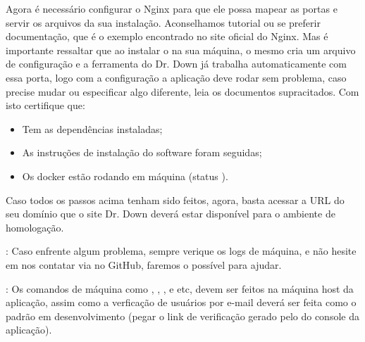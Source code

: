 \documentclass[letterpaper,10pt,english]{sphinxmanual}
\begin{document}
Agora é necessário configurar o Nginx para que ele possa mapear as portas e servir os arquivos da sua instalação.
Aconselhamos  tutorial ou se preferir  documentação, que é o exemplo encontrado no site oficial do Nginx.
Mas é importante ressaltar que ao instalar o  na sua máquina, o mesmo cria um arquivo  de configuração e a ferramenta do Dr. Down já trabalha automaticamente com essa porta, logo com a configuração  a aplicação deve rodar sem problema, caso precise mudar ou especificar algo diferente, leia os documentos supracitados.
Com isto certifique que:
\begin{itemize}
\item {} 
Tem as dependências instaladas;

\item {} 
As instruções de instalação do software foram seguidas;

\item {} 
Os  docker estão rodando em máquina (status ).

\end{itemize}

Caso todos os passos acima tenham sido feitos, agora, basta acessar a URL do seu domínio que o site Dr. Down deverá estar disponível para o ambiente de homologação.

: Caso enfrente algum problema, sempre verique os logs de máquina, e não hesite em nos contatar via  no GitHub, faremos o possível para ajudar.

: Os comandos de máquina como , , ,  e etc, devem ser feitos na máquina host da aplicação, assim como a verficação de usuários por e-mail deverá ser feita como o padrão em desenvolvimento (pegar o link de verificação gerado pelo  do console da aplicação).
\end{document}
